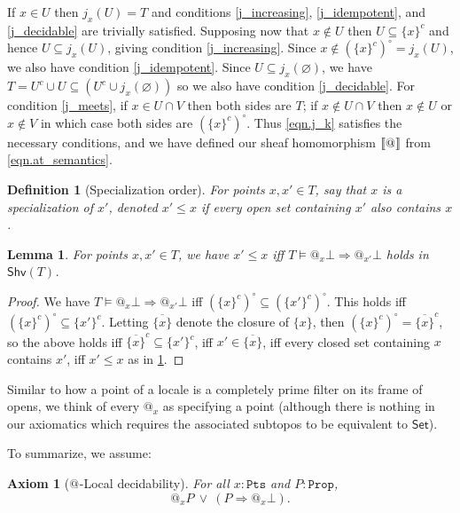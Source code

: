 \documentclass[reqno,11pt]{amsproc}
\makeatletter
\theoremstyle{plain}
\newtheorem{lemma}[theorem]{Lemma}
\newtheorem{definition}[theorem]{Definition}
\newtheorem{axiom}[theorem]{Axiom}\crefname{axiom}{Axiom}{Axioms}
\theoremstyle{definition}
\DeclarePairedDelimiter{\church}{\llbracket}{\rrbracket}
\newcommand{\Const}[1]{\mathtt{#1}}
\newcommand{\cat}[1]{\mathsf{#1}}
\newcommand{\ol}[1]{\overline{#1}}
\newcommand{\shv}{\cat{Shv}}
\newcommand{\prop}{\Const{Prop}}
\newcommand{\pt}{x}
\newcommand{\pts}{\mathtt{Pts}}		%
\newcommand{\atsymbol}{{@}}
\newcommand{\at}[1][\pt]{\atsymbol_{#1}}
\newcommand{\imp}{\Rightarrow}
\newcommand{\false}{\bot}
\numberwithin{equation}{section}
\makeatother
\begin{document}
If $\pt\in U$ then $j_\pt(U)=T$ and conditions \ref{j_increasing}, \ref{j_idempotent}, and \ref{j_decidable} are trivially satisfied. Supposing now that $\pt\not\in U$ then $U\subseteq \{\pt\}^c$ and hence $U\subseteq j_\pt(U)$, giving condition \ref{j_increasing}. Since $\pt\not\in(\{\pt\}^c)^\circ=j_\pt(U)$, we also have condition \ref{j_idempotent}. Since $U\subseteq j_\pt(\varnothing)$, we have $T=U^c\cup U\subseteq (U^c\cup j_\pt(\varnothing))$ so we also have condition \ref{j_decidable}. For condition \ref{j_meets}, if $\pt\in U\cap V$ then both sides are $T$; if $\pt\not\in U\cap V$ then $\pt\not\in U$ or $\pt\not\in V$ in which case both sides are $(\{\pt\}^c)^\circ$. Thus \eqref{eqn.j_k} satisfies the necessary conditions, and we have defined our sheaf homomorphism $\church{\at[]}$ from \eqref{eqn.at_semantics}.

\begin{definition}[Specialization order]\label{def.specialization}
For points $\pt,\pt' \in T$, say that $\pt$ is a \emph{specialization} of $\pt'$, denoted $\pt'\leq\pt$ if every open set containing $\pt'$ also contains $\pt$.
\end{definition}

\begin{lemma}\label{prop.specialization}
For points $\pt,\pt'\in T$, we have $\pt'\leq\pt$ iff $T\models\at\false\imp\at[\pt']\false$ holds in $\shv(T)$.
\end{lemma}
\begin{proof}
We have $T\models\at\false\imp\at[\pt']\false$ iff $(\{\pt\}^c)^\circ\subseteq(\{\pt'\}^c)^\circ$. This holds iff $(\{\pt\}^c)^\circ\subseteq\{\pt'\}^c$. Letting $\ol{\{\pt\}}$ denote the closure of $\{\pt\}$, then $(\{\pt\}^c)^\circ=\ol{\{\pt\}}^c$, so the above holds iff $\ol{\{\pt\}}^c\subseteq\{\pt'\}^c$, iff $\pt'\in\ol{\{\pt\}}$, iff every closed set containing $\pt$ contains $\pt'$, iff $\pt'\leq\pt$ as in \cref{def.specialization}.
\end{proof}


\medskip

Similar to how a point of a locale is a completely prime filter on its frame of opens, we think of every $\at $ as specifying a point (although there is nothing in our axiomatics which requires the associated subtopos to be equivalent to $\cat{Set}$). 

To summarize, we assume:

\begin{axiom}[{$\at[]$-Local decidability}]\label{ax.local_dec}
	For all $\pt : \pts$ and $P : \prop$,
	\[
		\at P \: \lor \: (P \imp \at \bot).
	\]
\end{axiom}
\end{document}
